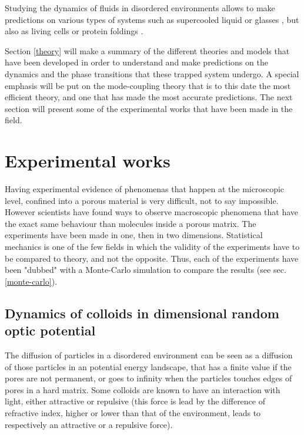 \documentclass[a4paper,12pt]{article}
\newcommand{\jline}{\vspace{10pt}}
\begin{document}
Studying the dynamics of fluids in disordered environments allows to make predictions on various types of systems such as supercooled liquid \cite{} or glasses \cite{}, but also as living cells \cite{} or protein foldings \cite{}.\jline

Section \ref{theory} will make a summary of the different theories and models that have been developed in order to understand and make predictions on the dynamics and the phase transitions that these trapped system undergo. A special emphasis will be put on the mode-coupling theory that is to this date the most efficient theory, and one that has made the most accurate predictions.
The next section will present some of the experimental works that have been made in the field.\jline

\section{Experimental works}
\label{exp}

Having experimental evidence of phenomenas that happen at the microscopic level, confined into a porous material is very difficult, not to say impossible. However scientists have found ways to observe macroscopic phenomena that have the exact same behaviour than molecules inside a porous matrix. The experiments have been made in one, then in two dimensions. Statistical mechanics is one of the few fields in which the validity of the experiments have to be compared to theory, and not the opposite. Thus, each of the experiments have been "dubbed" with a Monte-Carlo simulation to compare the results (see sec. \ref{monte-carlo}).

\subsection{Dynamics of colloids in dimensional random optic potential}

The diffusion of particles in a disordered environment can be seen as a diffusion of those particles in an potential energy landscape, that has a finite value if the pores are not permanent, or goes to infinity when the particles touches edges of pores in a hard matrix. Some colloids are known to have an interaction with light, either attractive or repulsive (this force is lead by the difference of refractive index, higher or lower than that of the environment, leads to respectively an attractive or a repulsive force).\jline
\end{document}
